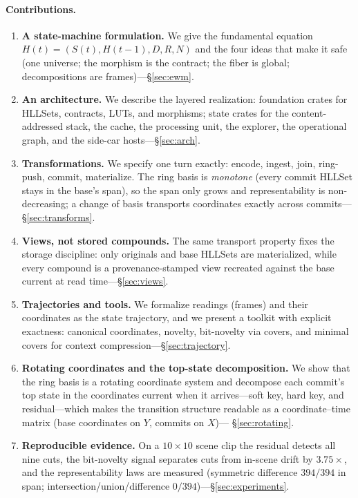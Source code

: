 \documentclass[11pt,a4paper]{article}
\theoremstyle{remark}
\begin{document}
\paragraph{Contributions.}
\begin{enumerate}[leftmargin=*,nosep]
  \item \textbf{A state-machine formulation.} We give the fundamental equation
    $H(t) = (S(t), H(t{-}1), D, R, N)$ and the four ideas that make it safe
    (one universe; the morphism is the contract; the fiber is global;
    decompositions are frames)---\S\ref{sec:ewm}.
  \item \textbf{An architecture.} We describe the layered realization:
    foundation crates for HLLSets, contracts, LUTs, and morphisms; state crates
    for the content-addressed stack, the cache, the processing unit, the
    explorer, the operational graph, and the side-car hosts---\S\ref{sec:arch}.
  \item \textbf{Transformations.} We specify one turn exactly: encode, ingest,
    join, ring-push, commit, materialize. The ring basis is \emph{monotone}
    (every commit HLLSet stays in the base's span), so the span only grows
    and representability is non-decreasing; a change of basis transports
    coordinates exactly across commits---\S\ref{sec:transforms}.
  \item \textbf{Views, not stored compounds.} The same transport property fixes
    the storage discipline: only originals and base HLLSets are materialized,
    while every compound is a provenance-stamped view recreated against the base
    current at read time---\S\ref{sec:views}.
  \item \textbf{Trajectories and tools.} We formalize readings (frames) and
    their coordinates as the state trajectory, and we present a toolkit with
    explicit exactness: canonical coordinates, novelty, bit-novelty via covers,
    and minimal covers for context compression---\S\ref{sec:trajectory}.
  \item \textbf{Rotating coordinates and the top-state decomposition.} We show
    that the ring basis is a rotating coordinate system and decompose each
    commit's top state in the coordinates current when it arrives---soft key,
    hard key, and residual---which makes the transition structure readable as a
    coordinate--time matrix (base coordinates on $Y$, commits on $X$)---%
    \S\ref{sec:rotating}.
  \item \textbf{Reproducible evidence.} On a $10\times10$ scene clip the
    residual detects all nine cuts, the bit-novelty signal separates cuts from
    in-scene drift by $3.75\times$, and the representability laws are measured
    (symmetric difference $394/394$ in span; intersection/union/difference
    $0/394$)---\S\ref{sec:experiments}.
\end{enumerate}
\end{document}
